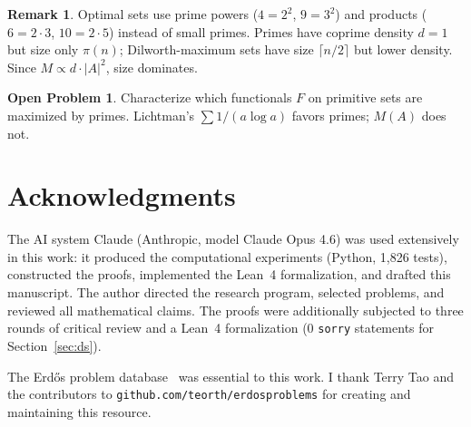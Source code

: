 \documentclass[11pt]{article}
\theoremstyle{plain}
\theoremstyle{definition}
\newtheorem{problem}[theorem]{Open Problem}
\newtheorem{remark}[theorem]{Remark}
\begin{document}
\begin{remark}\label{rem:structure}
Optimal sets use prime powers ($4=2^2$, $9=3^2$) and products
($6=2\cdot 3$, $10=2\cdot 5$) instead of small primes.
Primes have coprime density $d=1$ but size only $\pi(n)$;
Dilworth-maximum sets have size $\lceil n/2\rceil$ but lower density.
Since $M\propto d\cdot|A|^2$, size dominates.
\end{remark}

\begin{problem}\label{prob:func}
Characterize which functionals $F$ on primitive sets are maximized by
primes. Lichtman's $\sum 1/(a\log a)$ favors primes; $M(A)$ does not.
\end{problem}

\section*{Acknowledgments}

The AI system Claude (Anthropic, model Claude Opus 4.6) was used
extensively in this work: it produced the computational experiments
(Python, 1{,}826 tests), constructed the proofs, implemented the
Lean~4 formalization, and drafted this manuscript. The author
directed the research program, selected problems, and reviewed all
mathematical claims. The proofs were additionally subjected to three
rounds of critical review and a Lean~4 formalization (0
\texttt{sorry} statements for Section~\ref{sec:ds}).

The Erd\H{o}s problem database~\cite{tao2025erdos} was essential to
this work. I thank Terry Tao and the contributors to
\texttt{github.com/teorth/erdosproblems} for creating and maintaining
this resource.
\end{document}
